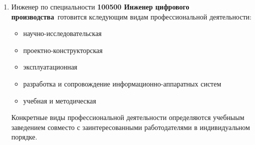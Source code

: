 \begin{enumerate}
  
  \item Инженер по специальности \textbf{100500 Инженер цифрового производства}\
  готовится  кследующим видам профессиональной деятельности:
  \begin{itemize}[nosep]
    \item научно-исследовательская
    \item проектно-конструкторская
    \item эксплуатационная
    \item разработка и сопровождение информационно-аппаратных систем
    \item учебная и методическая
  \end{itemize}
  
  Конкретные виды профессиональной деятельности определяются учебныым заведением
  совместо с заинтересованными работодателями в индивидуальном порядке.
  

\end{enumerate}
